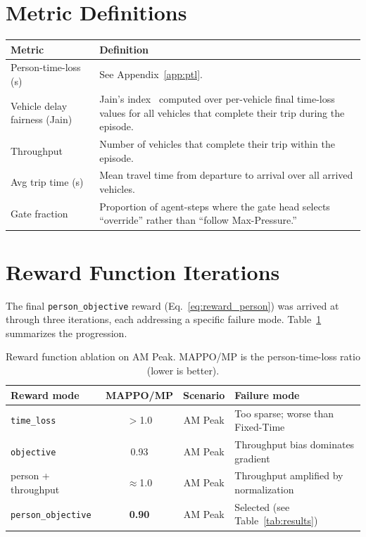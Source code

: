 \documentclass{article}
\begin{document}
\section{Metric Definitions}
\label{app:metrics}

\begin{table}[H]
  \centering
  \small
  \begin{tabularx}{\columnwidth}{@{}l X@{}}
    \toprule
    \textbf{Metric} & \textbf{Definition} \\
    \midrule
    Person-time-loss (s) & See Appendix~\ref{app:ptl}. \\
    Vehicle delay fairness (Jain) & Jain's index~\cite{jain1984} computed over per-vehicle final time-loss values for all vehicles that complete their trip during the episode. \\
    Throughput & Number of vehicles that complete their trip within the episode. \\
    Avg trip time (s) & Mean travel time from departure to arrival over all arrived vehicles. \\
    Gate fraction & Proportion of agent-steps where the gate head selects ``override'' rather than ``follow Max-Pressure.'' \\
    \bottomrule
  \end{tabularx}
\end{table}


\section{Reward Function Iterations}
\label{app:reward_iterations}

The final \texttt{person\_objective} reward (Eq.~\ref{eq:reward_person}) was arrived at through three iterations, each addressing a specific failure mode. Table~\ref{tab:reward_ablation} summarizes the progression.

\begin{table}[H]
  \centering
  \small
  \caption{Reward function ablation on AM Peak. MAPPO/MP is the person-time-loss ratio (lower is better).}
  \label{tab:reward_ablation}
  \begin{tabular}{@{}lccl@{}}
    \toprule
    \textbf{Reward mode} & \textbf{MAPPO/MP} & \textbf{Scenario} & \textbf{Failure mode} \\
    \midrule
    \texttt{time\_loss}        & $>$1.0  & AM Peak & Too sparse; worse than Fixed-Time \\
    \texttt{objective}         & 0.93    & AM Peak & Throughput bias dominates gradient \\
    person + throughput        & $\approx$1.0  & AM Peak & Throughput amplified by normalization \\
    \texttt{person\_objective} & \textbf{0.90} & AM Peak & Selected (see Table~\ref{tab:results}) \\
    \bottomrule
  \end{tabular}
\end{table}
\end{document}
